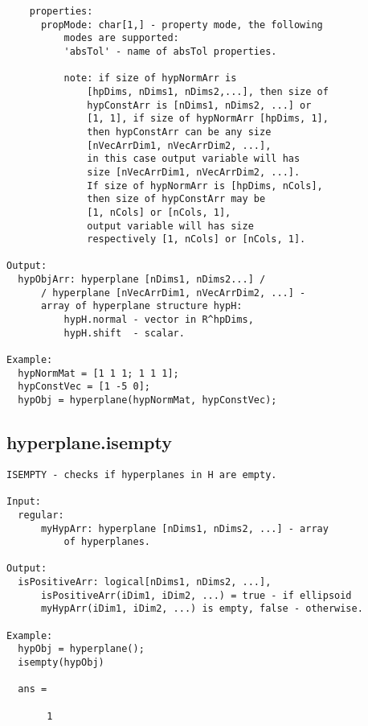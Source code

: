 \begin{verbatim}
    properties:
      propMode: char[1,] - property mode, the following
          modes are supported:
          'absTol' - name of absTol properties.

          note: if size of hypNormArr is
              [hpDims, nDims1, nDims2,...], then size of
              hypConstArr is [nDims1, nDims2, ...] or
              [1, 1], if size of hypNormArr [hpDims, 1],
              then hypConstArr can be any size
              [nVecArrDim1, nVecArrDim2, ...],
              in this case output variable will has
              size [nVecArrDim1, nVecArrDim2, ...].
              If size of hypNormArr is [hpDims, nCols],
              then size of hypConstArr may be
              [1, nCols] or [nCols, 1],
              output variable will has size
              respectively [1, nCols] or [nCols, 1].

Output:
  hypObjArr: hyperplane [nDims1, nDims2...] /
      / hyperplane [nVecArrDim1, nVecArrDim2, ...] -
      array of hyperplane structure hypH:
          hypH.normal - vector in R^hpDims,
          hypH.shift  - scalar.

Example:
  hypNormMat = [1 1 1; 1 1 1];
  hypConstVec = [1 -5 0];
  hypObj = hyperplane(hypNormMat, hypConstVec);
\end{verbatim}
\subsection{\texorpdfstring{hyperplane.isempty}{isempty}}\label{method:hyperplane.isempty}
\begin{verbatim}
ISEMPTY - checks if hyperplanes in H are empty.

Input:
  regular:
      myHypArr: hyperplane [nDims1, nDims2, ...] - array
          of hyperplanes.

Output:
  isPositiveArr: logical[nDims1, nDims2, ...],
      isPositiveArr(iDim1, iDim2, ...) = true - if ellipsoid
      myHypArr(iDim1, iDim2, ...) is empty, false - otherwise.

Example:
  hypObj = hyperplane();
  isempty(hypObj)

  ans =

       1
\end{verbatim}
